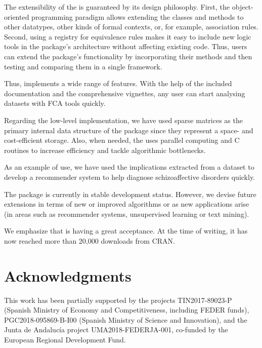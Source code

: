 The extensibility of the  is guaranteed by its design
philosophy. First, the object-oriented programming paradigm allows
extending the classes and methods to other datatypes, other kinds of
formal contexts, or, for example, association rules. Second, using a
registry for equivalence rules makes it easy to include new logic tools
in the package's architecture without affecting existing code. Thus,
users can extend the package's functionality by incorporating their
methods and then testing and comparing them in a single framework.

Thus,  implements a wide range of features. With the help of
the included documentation and the comprehensive vignettes, any user can
start analysing datasets with FCA tools quickly.

Regarding the low-level implementation, we have used sparse matrices as
the primary internal data structure of the package since they represent
a space- and cost-efficient storage. Also, when needed, the 
uses parallel computing and C routines to increase efficiency and tackle
algorithmic bottlenecks.

As an example of use, we have used the implications extracted from a
dataset to develop a recommender system to help diagnose schizoaffective
disorders quickly.

The package is currently in stable development status. However, we
devise future extensions in terms of new or improved algorithms or as
new applications arise (in areas such as recommender systems,
unsupervised learning or text mining).

We emphasize that  is having a great acceptance. At the time
of writing, it has now reached more than 20,000 downloads from CRAN.

\section*{Acknowledgments}

This work has been partially supported by the projects TIN2017-89023-P
(Spanish Ministry of Economy and Competitiveness, including FEDER
funds), PGC2018-095869-B-I00 (Spanish Ministry of Science and
Innovation), and the Junta de Andalucía project UMA2018-FEDERJA-001,
co-funded by the European Regional Development Fund.



\address{%
Pablo Cordero\\
Universidad de Málaga\\%
Departamento de Matemática Aplicada\\ ETSI Telecomunicaciones, Campus de
Teatinos\\
%
\url{http://webpersonal.uma.es/de/pcordero/My_personal_web/Wellcome.html}%
\\\textit{ORCiD: \href{https://orcid.org/0000-0002-5506-6467}{0000-0002-5506-6467}}%
\\\href{mailto:pcordero@uma.es}{\nolinkurl{pcordero@uma.es}}
}

